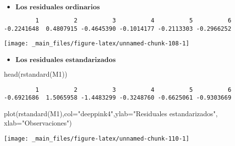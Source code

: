 \documentclass[
  a4paper,
  oneside,
  openany]{book}
\newenvironment{Shaded}{\begin{snugshade}}{\end{snugshade}}
\newcommand{\AttributeTok}[1]{\textcolor[rgb]{0.77,0.63,0.00}{#1}}
\newcommand{\FunctionTok}[1]{\textcolor[rgb]{0.00,0.00,0.00}{#1}}
\newcommand{\NormalTok}[1]{#1}
\newcommand{\SpecialCharTok}[1]{\textcolor[rgb]{0.00,0.00,0.00}{#1}}
\newcommand{\StringTok}[1]{\textcolor[rgb]{0.31,0.60,0.02}{#1}}
\providecommand{\tightlist}{%
  \setlength{\itemsep}{0pt}\setlength{\parskip}{0pt}}
\begin{document}
\begin{itemize}
\tightlist
\item
  \(\textbf{Los residuales ordinarios}\)
\end{itemize}

\begin{Shaded}
\end{Shaded}

\begin{verbatim}
         1          2          3          4          5          6 
-0.2241648  0.4807915 -0.4645390 -0.1014177 -0.2113303 -0.2966252 
\end{verbatim}

\begin{center}\texttt{[image: \_main\_files/figure-latex/unnamed-chunk-108-1]} \end{center}

\begin{itemize}
\tightlist
\item
  \(\textbf{Los residuales estandarizados}\)
\end{itemize}

\begin{Shaded}
\begin{Highlighting}[]
\FunctionTok{head}\NormalTok{(}\FunctionTok{rstandard}\NormalTok{(M1))}
\end{Highlighting}
\end{Shaded}

\begin{verbatim}
         1          2          3          4          5          6 
-0.6921686  1.5065958 -1.4483299 -0.3248760 -0.6625061 -0.9303669 
\end{verbatim}

\begin{Shaded}
\begin{Highlighting}[]
\FunctionTok{plot}\NormalTok{(}\FunctionTok{rstandard}\NormalTok{(M1),}\AttributeTok{col=}\StringTok{"deeppink4"}\NormalTok{,}\AttributeTok{ylab=}\StringTok{"Residuales estandarizados"}\NormalTok{, }\AttributeTok{xlab=}\StringTok{"Observaciones"}\NormalTok{)}
\end{Highlighting}
\end{Shaded}

\begin{center}\texttt{[image: \_main\_files/figure-latex/unnamed-chunk-110-1]} \end{center}
\end{document}
